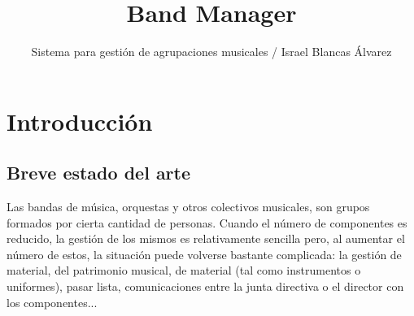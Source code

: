 \documentclass[11pt,spanish]{article}
\title{Band Manager}
\author{Sistema para gestión de agrupaciones musicales
        \newline / Israel Blancas Álvarez}
\begin{document}
\maketitle

\tableofcontents
\clearpage

\section{Introducción}

\subsection{Breve estado del arte}

\noindent
Las bandas de música, orquestas y otros colectivos musicales, son grupos
formados por cierta cantidad de personas. Cuando el número de componentes es reducido,
la gestión de los mismos es relativamente sencilla pero, al aumentar el número de estos,
la situación puede volverse bastante complicada: la gestión de material, del patrimonio
musical, de material (tal como instrumentos o uniformes),
pasar lista, comunicaciones entre la junta directiva o el director con los componentes...
\end{document}
